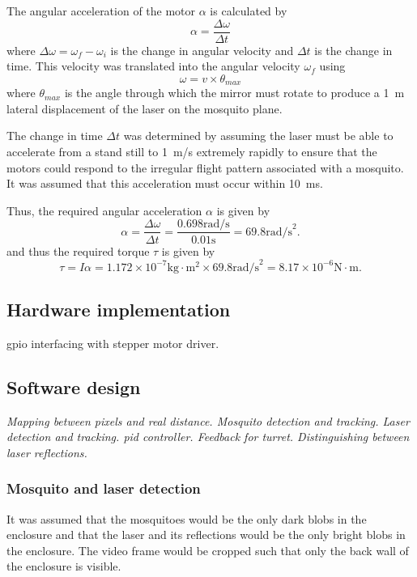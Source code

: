 The angular acceleration of the motor $\alpha$ is calculated by
\begin{equation}
    \alpha = \frac{\Delta\omega}{\Delta t}
    \label{eq:angular_acceleration}
\end{equation}
where $\Delta\omega = \omega_f - \omega_i$ is the change in angular velocity and $\Delta t$ is the change in time.  This velocity was translated into the angular velocity $\omega_f$ using
\begin{equation}
    \omega = v \times \theta_{max}
    \label{eq:angular_velocity}
\end{equation}
where $\theta_{max}$ is the angle through which the mirror must rotate to produce a 1~m lateral displacement of the laser on the mosquito plane.

The change in time $\Delta t$ was determined by assuming the laser must be able to accelerate from a stand still to 1~m/s extremely rapidly to ensure that the motors could respond to the irregular flight pattern associated with a mosquito. It was assumed that this acceleration must occur within 10~ms.

Thus, the required angular acceleration $\alpha$ is given by
\begin{equation}
    \alpha = \frac{\Delta\omega}{\Delta t} = \frac{0.698 \text{rad/s}}{0.01 \text{s}} = 69.8 \text{rad/s}^2.
    \label{eq:angular_acceleration_calculation}
\end{equation}
and thus the required torque $\tau$ is given by
\begin{equation}
    \tau = I\alpha = 1.172 \times 10^{-7} \text{kg} \cdot \text{m}^2 \times 69.8 \text{rad/s}^2 = 8.17 \times 10^{-6} \text{N} \cdot \text{m}.
    \label{eq:torque_calculation}
\end{equation}


\subsection{Hardware implementation}
\gls{gpio} interfacing with stepper motor driver.


\subsection{Software design}
\textit{Mapping between pixels and real distance. Mosquito detection and tracking. Laser detection and tracking. \gls{pid} controller. Feedback for turret. Distinguishing between laser reflections.}

\subsubsection{Mosquito and laser detection}
It was assumed that the mosquitoes would be the only dark blobs in the enclosure and that the laser and its reflections would be the only bright blobs in the enclosure. The video frame would be cropped such that only the back wall of the enclosure is visible.

